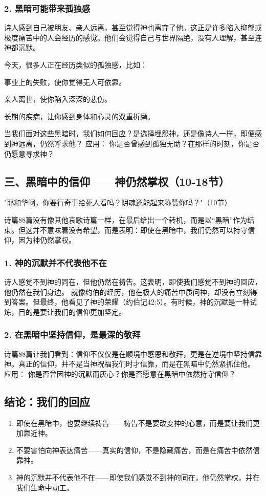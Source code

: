 \documentclass[a4paper, 12pt]{article}
\begin{document}
\subsubsection*{2. 黑暗可能带来孤独感}
\hspace{0.6cm}诗人感到自己被朋友、亲人远离，甚至觉得神也离弃了他。这正是许多陷入抑郁或极度痛苦中的人会经历的感觉。他们会觉得自己与世界隔绝，没有人理解，甚至连神都沉默。

今天，很多人正在经历类似的孤独感，比如：

事业上的失败，使你觉得无人可依靠。

亲人离世，使你陷入深深的悲伤。

长期的疾病，让你感到身体和心灵的双重折磨。

当我们面对这些黑暗时，我们如何回应？是选择埋怨神，还是像诗人一样，即便感到神远离，仍然呼求他？
应用： 你是否曾感到孤独无助？在那样的时刻，你是否仍愿意寻求神？
\subsection*{三、黑暗中的信仰——神仍然掌权（10-18节）}
"耶和华啊，你要行奇事给死人看吗？阴魂还能起来称赞你吗？"（10节）

诗篇88篇没有像其他哀歌诗篇一样，在最后给出一个转机，而是以“黑暗”作为结束。但这并不意味着没有希望，而是表明：即使在黑暗中，我们仍然可以持守信仰，因为神仍然掌权。
\subsubsection*{1. 神的沉默并不代表他不在}
诗人感觉不到神的同在，但他仍然在祷告。这表明，即使我们感觉不到神的回应，他仍然在我们身边。
就像约伯的经历，他在极大的痛苦中质问神，却没有立刻得到答案。但最终，他看见了神的荣耀（约伯记42:5）。有时候，神的沉默是一种试炼，目的是要让我们的信仰更加坚定。
\subsubsection*{2. 在黑暗中坚持信仰，是最深的敬拜}
诗篇88篇让我们看到：信仰不仅仅是在顺境中感恩和敬拜，更是在逆境中坚持信靠神。真正的信仰，并不是当神祝福我们时才信靠，而是在黑暗中仍然紧抓住他。
应用： 你是否曾因神的沉默而灰心？你是否愿意在黑暗中依然持守信仰？
\subsection*{结论：我们的回应}
\begin{enumerate}
    \item 即使在黑暗中，也要继续祷告——祷告不是要改变神的心意，而是要让我们更加靠近神。

    \item 不要害怕向神表达痛苦——真实的信仰，不是隐藏痛苦，而是在痛苦中依然信靠神。

    \item 神的沉默并不代表他不在——即使我们感觉不到神的同在，他仍然掌权，并在我们生命中动工。

\end{enumerate}
\end{document}
